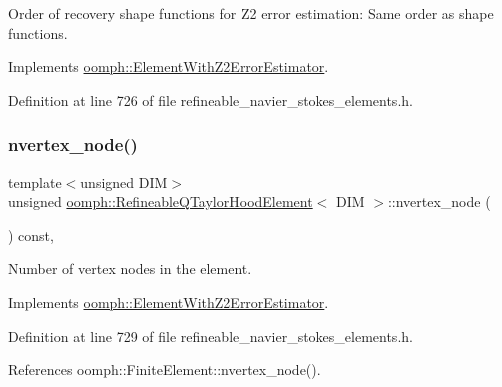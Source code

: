 Order of recovery shape functions for Z2 error estimation\+: Same order as shape functions. 



Implements \hyperlink{classoomph_1_1ElementWithZ2ErrorEstimator_af39480835bd3e0f6b2f4f7a9a4044798}{oomph\+::\+Element\+With\+Z2\+Error\+Estimator}.



Definition at line 726 of file refineable\+\_\+navier\+\_\+stokes\+\_\+elements.\+h.

\mbox{\label{classoomph_1_1RefineableQTaylorHoodElement_a216582f193bf05ba8baf3ef3683da788}} 
\subsubsection{\texorpdfstring{nvertex\+\_\+node()}{nvertex\_node()}}
{\footnotesize\ttfamily template$<$unsigned D\+IM$>$ \\
unsigned \hyperlink{classoomph_1_1RefineableQTaylorHoodElement}{oomph\+::\+Refineable\+Q\+Taylor\+Hood\+Element}$<$ D\+IM $>$\+::nvertex\+\_\+node (\begin{DoxyParamCaption}{ }\end{DoxyParamCaption}) const\hspace{0.3cm}{\ttfamily [inline]}, {\ttfamily [virtual]}}



Number of vertex nodes in the element. 



Implements \hyperlink{classoomph_1_1ElementWithZ2ErrorEstimator_a19495a0e77ef4ff35f15fdf7913b4077}{oomph\+::\+Element\+With\+Z2\+Error\+Estimator}.



Definition at line 729 of file refineable\+\_\+navier\+\_\+stokes\+\_\+elements.\+h.



References oomph\+::\+Finite\+Element\+::nvertex\+\_\+node().

\mbox{\label{classoomph_1_1RefineableQTaylorHoodElement_a38bdcf951d151c1d29cf8f908278c1a4}} 
